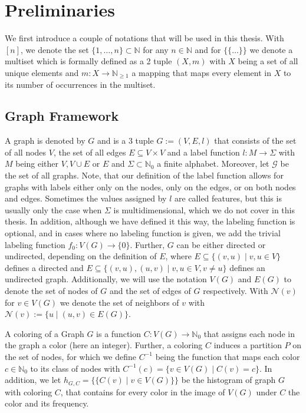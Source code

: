 \documentclass[11pt, dvipsnames, DIV=12]{scrreprt}
\theoremstyle{definition}
\newcommand{\MSopen}{\{\!\!\{}
\newcommand{\MSclose}{\}\!\!\}}
\begin{document}
\section{Preliminaries}
We first introduce a couple of notations that will be used in this thesis. With $[n]$, we denote the set $\{1, \ldots, n\} \subset \mathbb{N}$ for any $n \in \mathbb{N}$ and for $\MSopen \ldots \MSclose$ we denote a multiset which is formally defined as a 2 tuple $(X, m)$ with $X$ being a set of all unique elements and $m: X \rightarrow \mathbb{N}_{\geq 1}$ a mapping that maps every element in $X$ to its number of occurrences in the multiset.

\subsection{Graph Framework}
A graph is denoted by $G$ and is a 3 tuple $G:= (V, E, l)$ that consists of the set of all nodes $V$, the set of all edges $E \subseteq V \times V$ and a label function $l: M \rightarrow \Sigma$ with $M$ being either $V, V \cup E$ or $E$ and $\Sigma \subset \mathbb{N}_0$ a finite alphabet. Moreover, let $\mathcal{G}$ be the set of all graphs. Note, that our definition of the label function allows for graphs with labels either only on the nodes, only on the edges, or on both nodes and edges. Sometimes the values assigned by $l$ are called features, but this is usually only the case when $\Sigma$ is multidimensional, which we do not cover in this thesis. In addition, although we have defined it this way, the labeling function is optional, and in cases where no labeling function is given, we add the trivial labeling function $f_0: V(G) \rightarrow \{0\}$. Further, $G$ can be either directed or undirected, depending on the definition of $E$, where $E \subseteq \{(v,u) \mid v,u \in V\}$ defines a directed and $E \subseteq \{(v, u), (u,v) \mid v,u \in V, v\neq u\}$ defines an undirected graph. Additionally, we will use the notation $V(G)$ and $E(G)$ to denote the set of nodes of $G$ and the set of edges of $G$ respectively. With $\mathcal{N}(v)$ for $v \in V(G)$ we denote the set of neighbors of $v$ with $\mathcal{N}(v) := \{u \mid (u, v) \in E(G)\}$.

A coloring of a Graph $G$ is a function $C: V(G) \rightarrow \mathbb{N}_0$ that assigns each node in the graph a color (here an integer). Further, a coloring $C$ induces a partition $P$ on the set of nodes, for which we define $C^{-1}$ being the function that maps each color $c \in \mathbb{N}_0$ to its class of nodes with $C^{-1}(c) = \{ v\in V(G) \mid C(v) = c\}$. In addition, we let $h_{G, C} = \MSopen C(v) \mid v \in V(G) \MSclose$ be the histogram of graph $G$ with coloring $C$, that contains for every color in the image of $V(G)$ under $C$ the color and its frequency.
\end{document}
